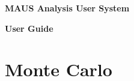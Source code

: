 \documentclass[a4paper, 10pt] {report}
\begin{document}
\vspace*{2.0cm}

\begin{center}
\Large{ \bf{MAUS Analysis User System} }

\Large{ \bf{User Guide} }
\end{center}

%


\chapter{Monte Carlo}


%
%
%
%
%

%


\end{document}
